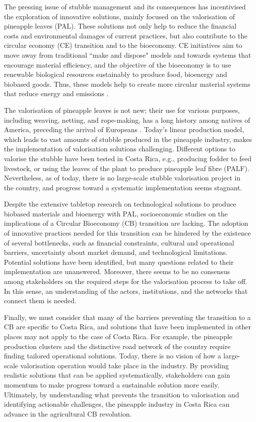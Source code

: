 The pressing issue of stubble management and its consequences has incentivised the exploration of innovative solutions, mainly focused on the valorisation of pineapple leaves (PAL). These solutions not only help to reduce the financial costs and environmental damages of current practices, but also contribute to the circular economy (CE) transition and to the bioeconomy. CE initiatives aim to move away from traditional ``make and dispose" models and towards systems that encourage material efficiency, and the objective of the bioeconomy is to use renewable biological resources sustainably to produce food, bioenergy and biobased goods. Thus, these models help to create more circular material systems that reduce energy and emissions \citep{IPCC_2022_WGIII_SPM}. 

The valorisation of pineapple leaves is not new; their use for various purposes, including weaving, netting, and rope-making, has a long history among natives of America, preceding the arrival of Europeans \citep{collins1949history, o2013pineapple}. Today's linear production model, which leads to vast amounts of stubble produced in the pineapple industry, makes the implementation of valorisation solutions challenging. Different options to valorise the stubble have been tested in Costa Rica, e.g., producing fodder to feed livestock, or using the leaves of the plant to produce pineapple leaf fibre (PALF). Nevertheless, as of today, there is no large-scale stubble valorisation project in the country, and progress toward a systematic implementation seems stagnant. 

Despite the extensive tabletop research on technological solutions to produce biobased materials and bioenergy with PAL, socioeconomic studies on the implications of a Circular Bioeconomy (CB) transition are lacking. The adoption of innovative practices needed for this transition can be hindered by the existence of several bottlenecks, such as financial constraints, cultural and operational barriers, uncertainty about market demand, and technological limitations. Potential solutions have been identified, but many questions related to their implementation are unanswered. Moreover, there seems to be no consensus among stakeholders on the required steps for the valorisation process to take off. In this sense, an understanding of the actors, institutions, and the networks that connect them is needed. 

Finally, we must consider that many of the barriers preventing the transition to a CB are specific to Costa Rica, and solutions that have been implemented in other places may not apply to the case of Costa Rica. For example, the pineapple production clusters and the distinctive road network of the country require finding tailored operational solutions. Today, there is no vision of how a large-scale valorisation operation would take place in the industry. By providing realistic solutions that can be applied systematically, stakeholders can gain momentum to make progress toward a sustainable solution more easily. Ultimately, by understanding what prevents the transition to valorisation and identifying actionable challenges, the pineapple industry in Costa Rica can advance in the agricultural CB revolution. 

